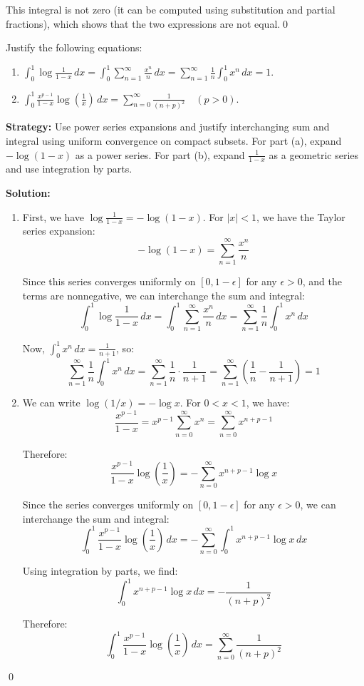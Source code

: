 This integral is not zero (it can be computed using substitution and partial fractions), which shows that the two expressions are not equal.\qed


\begin{problembox}
\begin{problemstatement}
Justify the following equations:
\begin{enumerate}[label=(\alph*)]
\item $\int_{0}^{1} \log \frac{1}{1-x} \, dx = \int_{0}^{1} \sum_{n=1}^{\infty} \frac{x^n}{n} \, dx = \sum_{n=1}^{\infty} \frac{1}{n} \int_{0}^{1} x^n \, dx = 1.$
\item $\int_{0}^{1} \frac{x^{p-1}}{1-x} \log \left( \frac{1}{x} \right) \, dx = \sum_{n=0}^{\infty} \frac{1}{(n+p)^2} \quad (p > 0).$
\end{enumerate}
\end{problemstatement}
\end{problembox}

\noindent\textbf{Strategy:} Use power series expansions and justify interchanging sum and integral using uniform convergence on compact subsets. For part (a), expand $-\log(1-x)$ as a power series. For part (b), expand $\frac{1}{1-x}$ as a geometric series and use integration by parts.

\bigskip\noindent\textbf{Solution:}
\begin{enumerate}[label=(\alph*)]
\item First, we have $\log \frac{1}{1-x} = -\log(1-x)$. For $|x| < 1$, we have the Taylor series expansion:
\[-\log(1-x) = \sum_{n=1}^{\infty} \frac{x^n}{n}\]

Since this series converges uniformly on $[0, 1-\epsilon]$ for any $\epsilon > 0$, and the terms are nonnegative, we can interchange the sum and integral:
\[\int_{0}^{1} \log \frac{1}{1-x} \, dx = \int_{0}^{1} \sum_{n=1}^{\infty} \frac{x^n}{n} \, dx = \sum_{n=1}^{\infty} \frac{1}{n} \int_{0}^{1} x^n \, dx\]

Now, $\int_{0}^{1} x^n \, dx = \frac{1}{n+1}$, so:
\[\sum_{n=1}^{\infty} \frac{1}{n} \int_{0}^{1} x^n \, dx = \sum_{n=1}^{\infty} \frac{1}{n} \cdot \frac{1}{n+1} = \sum_{n=1}^{\infty} \left(\frac{1}{n} - \frac{1}{n+1}\right) = 1\]

\item We can write $\log(1/x) = -\log x$. For $0 < x < 1$, we have:
\[\frac{x^{p-1}}{1-x} = x^{p-1} \sum_{n=0}^{\infty} x^n = \sum_{n=0}^{\infty} x^{n+p-1}\]

Therefore:
\[\frac{x^{p-1}}{1-x} \log \left( \frac{1}{x} \right) = -\sum_{n=0}^{\infty} x^{n+p-1} \log x\]

Since the series converges uniformly on $[0, 1-\epsilon]$ for any $\epsilon > 0$, we can interchange the sum and integral:
\[\int_{0}^{1} \frac{x^{p-1}}{1-x} \log \left( \frac{1}{x} \right) \, dx = -\sum_{n=0}^{\infty} \int_{0}^{1} x^{n+p-1} \log x \, dx\]

Using integration by parts, we find:
\[\int_{0}^{1} x^{n+p-1} \log x \, dx = -\frac{1}{(n+p)^2}\]

Therefore:
\[\int_{0}^{1} \frac{x^{p-1}}{1-x} \log \left( \frac{1}{x} \right) \, dx = \sum_{n=0}^{\infty} \frac{1}{(n+p)^2}\]
\end{enumerate}\qed


